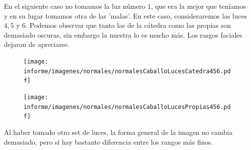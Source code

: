 En el siguiente caso no tomamos la luz número $1$, que era la mejor que teníamos y en su lugar tomamos otra de las 'malas'. En este caso, consideraremos las luces $4, 5$ y $6$. Podemos observar que tanto las de la cátedra como las propias son demasiado oscuras, sin embargo la nuestra lo es mucho más. Los rasgos faciales dejaron de apreciarse. \\

\begin{figure}[H]
\centering
\begin{minipage}{.5\textwidth}
    \centering
        \texttt{[image: informe/imagenes/normales/normalesCaballoLucesCatedra456.pdf]}
\end{minipage}%
\begin{minipage}{.5\textwidth}
    \centering
        \texttt{[image: informe/imagenes/normales/normalesCaballoLucesPropias456.pdf]} \\
\end{minipage}
\end{figure}

Al haber tomado otro set de luces, la forma general de la imagen no cambia demasiado, pero sí hay bastante diferencia entre los rangos más finos.

